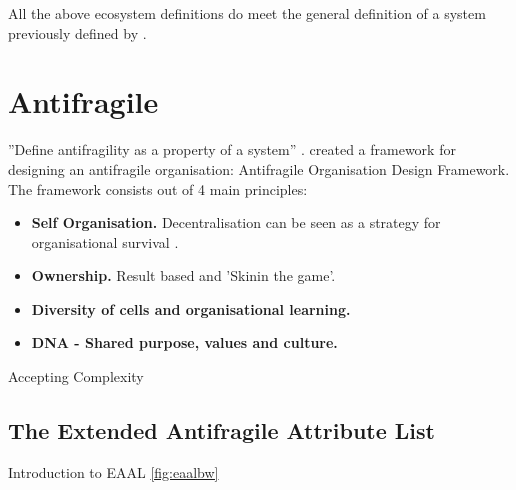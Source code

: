 All the above ecosystem definitions do meet the general definition of a system previously defined by \textcites{Ackoff1973}[p.~183]{Gharajedaghi2011}[p.~13--14]{Mannaert2016}.

\section{Antifragile}
\label{sec:tbantifragile}

''Define antifragility as a property of a system'' \parencite{Jaaron2014}. \textcite{Kastner2017} created a framework for designing an antifragile organisation: Antifragile Organisation Design Framework. The framework consists out of 4 main principles:
\begin{itemize}
	\item{\textbf{Self Organisation.} Decentralisation can be seen as a strategy for organisational survival \parencite{Brafman2007}.}
	\item{\textbf{Ownership.} Result based and 'Skinin the game'.}
	\item{\textbf{Diversity of cells and organisational learning.}}
	\item{\textbf{DNA - Shared purpose, values and culture.}}
\end{itemize}

Accepting Complexity 
\newpage
\subsection{The Extended Antifragile Attribute List}
\label{sub:tbeaal}

Introduction to EAAL \cref{fig:eaalbw}

